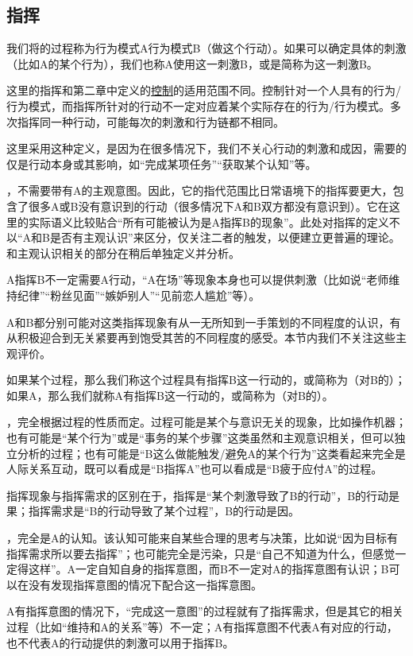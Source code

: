 \subsection{指挥}
我们将的过程称为行为模式A行为模式B（做这个行动）。如果可以确定具体的刺激（比如A的某个行为），我们也称A使用这一刺激B，或是简称为这一刺激B。
\begin{explain}
这里的指挥和第二章中定义的\hyperref[def:控制人]{控制}的适用范围不同。控制针对一个人具有的行为/行为模式，而指挥所针对的行动不一定对应着某个实际存在的行为/行为模式。多次指挥同一种行动，可能每次的刺激和行为链都不相同。

这里采用这种定义，是因为在很多情况下，我们不关心行动的刺激和成因，需要的仅是行动本身或其影响，如“完成某项任务”“获取某个认知”等。

，不需要带有A的主观意图。因此，它的指代范围比日常语境下的指挥要更大，包含了很多A或B没有意识到的行动（很多情况下A和B双方都没有意识到）。它在这里的实际语义比较贴合“所有可能被认为是A指挥B的现象”。此处对指挥的定义不以“A和B是否有主观认识”来区分，仅关注二者的触发，以便建立更普遍的理论。和主观认识相关的部分在稍后单独定义并分析。

A指挥B不一定需要A行动，“A在场”等现象本身也可以提供刺激（比如说“老师维持纪律”“粉丝见面”“嫉妒别人”“见前恋人尴尬”等）。

A和B都分别可能对这类指挥现象有从一无所知到一手策划的不同程度的认识，有从积极迎合到无关紧要再到饱受其苦的不同程度的感受。本节内我们不关注这些主观评价。
\end{explain}
如果某个过程，那么我们称这个过程具有指挥B这一行动的，或简称为（对B的）；如果A，那么我们就称A有指挥B这一行动的，或简称为（对B的）。
\begin{explain}
，完全根据过程的性质而定。过程可能是某个与意识无关的现象，比如操作机器；也有可能是“某个行为”或是“事务的某个步骤”这类虽然和主观意识相关，但可以独立分析的过程；也有可能是“B这么做能触发/避免A的某个行为”这类看起来完全是人际关系互动，既可以看成是“B指挥A”也可以看成是“B疲于应付A”的过程。

指挥现象与指挥需求的区别在于，指挥是“某个刺激导致了B的行动”，B的行动是果；指挥需求是“B的行动导致了某个过程”，B的行动是因。

，完全是A的认知。该认知可能来自某些合理的思考与决策，比如说“因为目标有指挥需求所以要去指挥”；也可能完全是污染，只是“自己不知道为什么，但感觉一定得这样”。A一定自知自身的指挥意图，而B不一定对A的指挥意图有认识；B可以在没有发现指挥意图的情况下配合这一指挥意图。

A有指挥意图的情况下，“完成这一意图”的过程就有了指挥需求，但是其它的相关过程（比如“维持和A的关系”等）不一定；A有指挥意图不代表A有对应的行动，也不代表A的行动提供的刺激可以用于指挥B。
\end{explain}
